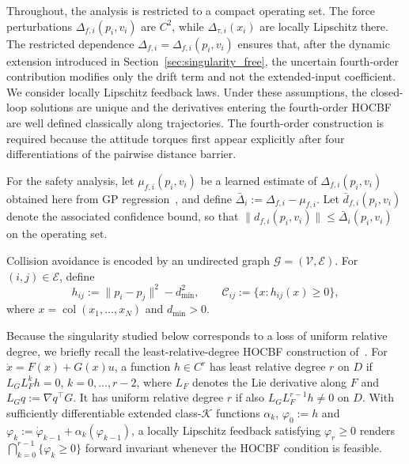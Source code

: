 \documentclass[10pt,a4paper]{amsart}
\begin{document}
Throughout, the analysis is restricted to a compact operating
set. The force perturbations $\Delta_{f,i}(p_i,v_i)$ are
$C^2$, while $\Delta_{\tau,i}(x_i)$ are locally Lipschitz
there. The restricted dependence
$\Delta_{f,i}=\Delta_{f,i}(p_i,v_i)$ ensures that, after the
dynamic extension introduced in Section~\ref{sec:singularity_free}, the uncertain
fourth-order contribution modifies only the drift term and not
the extended-input coefficient. We consider locally Lipschitz feedback laws. Under
these assumptions, the closed-loop solutions are unique and
the derivatives entering the fourth-order HOCBF are well
defined classically along trajectories. The fourth-order construction is required because the attitude
torques first appear explicitly after four differentiations of
the pairwise distance barrier.

For the safety analysis, let $\mu_{f,i}(p_i,v_i)$ be a learned
estimate of $\Delta_{f,i}(p_i,v_i)$ obtained here from GP
regression~\cite{rasmussen2006gpml}, and define
$\bar\Delta_i:=\Delta_{f,i}-\mu_{f,i}$. Let $\bar d_{f,i}(p_i,v_i)$ denote the associated
confidence bound, so that $\|d_{f,i}(p_i,v_i)\|\le
\bar\Delta_i(p_i,v_i)$ on the operating set.

Collision avoidance is encoded by an undirected graph
$\mathcal G=(\mathcal V,\mathcal E)$. For $(i,j)\in\mathcal E$,
define
\begin{equation}
    h_{ij}:=\|p_i-p_j\|^2-d_{\min}^2,
    \qquad
    \mathcal C_{ij}:=\{x:h_{ij}(x)\ge0\},
    \label{eq:hij}
\end{equation}
where $x=\operatorname{col}(x_1,\ldots,x_N)$ and
$d_{\min}>0$.

Because the singularity studied below corresponds to a loss of uniform relative degree, we briefly recall the
least-relative-degree HOCBF construction of~\cite{tan2022highorder}. For
$\dot x=F(x)+G(x)u$, a function $h\in C^r$ has least
relative degree $r$ on $D$ if
$L_GL_F^kh=0$, $k=0,\ldots,r-2$, where $L_F$ denotes
the Lie derivative along $F$ and
$L_Gq:=\nabla q^\top G$. It has uniform relative degree
$r$ if also $L_GL_F^{r-1}h\neq0$ on $D$. With sufficiently differentiable extended class-$\mathcal K$
functions $\alpha_k$,
$\varphi_0:=h$ and
$\varphi_k:=\dot\varphi_{k-1}+\alpha_k(\varphi_{k-1})$,
a locally Lipschitz feedback satisfying $\varphi_r\ge0$
renders
$\bigcap_{k=0}^{r-1}\{\varphi_k\ge0\}$ forward invariant
whenever the HOCBF condition is feasible. 
\end{document}
